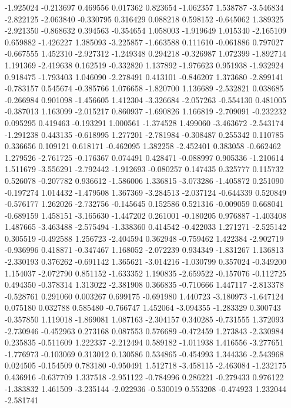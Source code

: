 -1.925024
-0.213697
0.469556
0.017362
0.823654
-1.062357
1.538787
-3.546834
-2.822125
-2.063840
-0.330795
0.316429
0.088218
0.598152
-0.645062
1.389325
-2.921350
-0.868632
0.394563
-0.354654
1.058003
-1.919649
1.015340
-2.165109
0.659882
-1.426227
1.385093
-3.225857
-1.663588
0.111610
-0.061886
0.797027
-0.667555
1.452310
-2.927312
-1.249348
0.294218
-0.326987
1.072399
-1.892714
1.191369
-2.419638
0.162519
-0.332820
1.137892
-1.976623
0.951938
-1.932924
0.918475
-1.793403
1.046090
-2.278491
0.413101
-0.846207
1.373680
-2.899141
-0.783157
0.545674
-0.385766
1.076658
-1.820700
1.136689
-2.532821
0.038685
-0.266984
0.901098
-1.456605
1.412304
-3.326684
-2.057263
-0.554130
0.481005
-0.387013
1.163099
-2.015217
0.860937
-1.690826
1.166819
-2.709091
-0.232232
0.095295
0.419463
-0.193291
1.000561
-1.374528
1.499060
-3.463672
-2.543174
-1.291238
0.443135
-0.618995
1.277201
-2.781984
-0.308487
0.255342
0.110785
0.336656
0.109121
0.618171
-0.462095
1.382258
-2.452401
0.383058
-0.662462
1.279526
-2.761725
-0.176367
0.074491
0.428471
-0.088997
0.905336
-1.210614
1.511679
-3.556291
-2.792442
-1.912693
-0.080257
0.147435
0.325777
0.115732
0.526078
-0.207782
0.936612
-1.586006
1.336815
-3.073286
-1.405872
0.251090
-0.197274
1.014432
-1.479508
1.367369
-3.284513
-2.037124
-0.644339
0.520849
-0.576177
1.262026
-2.732756
-0.145645
0.152586
0.521316
-0.009059
0.668041
-0.689159
1.458151
-3.165630
-1.447202
0.261001
-0.180205
0.976887
-1.403408
1.487665
-3.463488
-2.575494
-1.338360
0.414542
-0.422033
1.271271
-2.525142
0.305519
-0.492588
1.256723
-2.404594
0.362948
-0.759462
1.422384
-2.902719
-0.936996
0.418871
-0.347467
1.168052
-2.072239
0.934349
-1.831267
1.136813
-2.330193
0.376262
-0.691142
1.365621
-3.014216
-1.030799
0.357024
-0.349200
1.154037
-2.072790
0.851152
-1.633352
1.190835
-2.659522
-0.157076
-0.112725
0.494350
-0.378314
1.313022
-2.381908
0.366835
-0.710666
1.447117
-2.813378
-0.528761
0.291060
0.003267
0.699175
-0.691980
1.440723
-3.180973
-1.647124
0.075180
0.032788
0.585480
-0.766747
1.452064
-3.094355
-1.283329
0.300743
-0.357850
1.119018
-1.869081
1.087163
-2.304157
0.340285
-0.731555
1.372093
-2.730946
-0.452963
0.273168
0.087553
0.576689
-0.472459
1.273843
-2.330984
0.235835
-0.511609
1.222337
-2.212494
0.589182
-1.011938
1.416556
-3.277651
-1.776973
-0.103069
0.313012
0.130586
0.534865
-0.454993
1.344336
-2.543968
0.024505
-0.154509
0.783180
-0.950491
1.512718
-3.458115
-2.463084
-1.232175
0.436916
-0.637709
1.337518
-2.951122
-0.784996
0.286221
-0.279433
0.976122
-1.383832
1.461509
-3.235144
-2.022936
-0.530019
0.553208
-0.474923
1.232044
-2.581741
